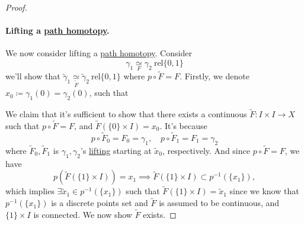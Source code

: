 \begin{proof}
	\paragraph{Lifting a \hyperref[def:homotopy-path]{path homotopy}.} We now consider lifting a \hyperref[def:homotopy-path]{path homotopy}. Consider
	\[
		\gamma _1\underset{F}{\simeq } \gamma _2 \ \mathrm{rel} \{0, 1\}
	\]
	we'll show that \(\widetilde{\gamma}_1\underset{\widetilde{F} }{\simeq} \widetilde{\gamma}_2 \ \mathrm{rel} \{0, 1\}\) where \(p\circ \widetilde{F} = F\). Firstly,
	we denote \(x_0\coloneqq\gamma _1(0) = \gamma _2(0)\), such that
	\begin{figure}[H]
		\centering
		\label{fig:pf:col:lec14-4}
	\end{figure}
	We claim that it's sufficient to show that there exists a continuous \(\widetilde{F} \colon I\times I\to X\) such that \(p\circ \widetilde{F} = F\), and \(\widetilde{F} (\{0\}\times I)= x_0\).
	It's because
	\[
		p\circ \widetilde{F} _0 = F_0 = \gamma _1,\quad p\circ \widetilde{F} _1= F_1= \gamma _2
	\]
	where \(\widetilde{F} _0, \widetilde{F} _1\) is \(\gamma _1, \gamma _2\)'s \hyperref[prop:homotopy-lifting-property]{lifting} starting at \(\widetilde{x} _0\), respectively. And since
	\(p\circ\widetilde{F} = F\), we have
	\[
		p\left(\widetilde{F} (\{1\}\times I)\right) = x_1 \implies \widetilde{F} (\{1\}\times I)\subset p^{-1} (\{x_1\}),
	\]
	which implies \(\exists \widetilde{x} _1 \in p^{-1} (\{x_1\})\) such that \(\widetilde{F} (\{1\}\times I) = \widetilde{x} _1\) since we know that \(p^{-1} (\{x_1\})\) is a discrete
	points set and \(\widetilde{F} \) is assumed to be continuous, and \(\{1\}\times I\) is connected. We now show \(\widetilde{F} \) exists.


\end{proof}
